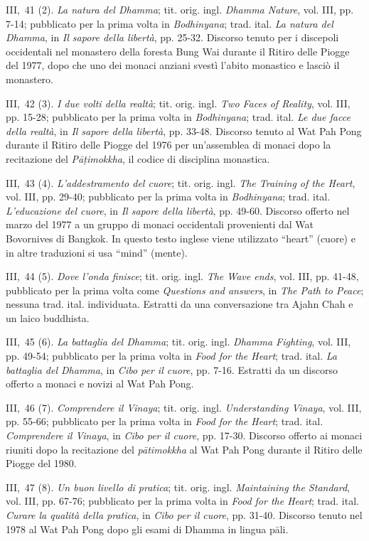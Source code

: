 III,~41 (2). \emph{La natura del Dhamma}; tit. orig. ingl. \emph{Dhamma
Nature}, vol. III, pp. 7-14; pubblicato per la prima volta in
\emph{Bodhinyana}; trad. ital. \emph{La natura del Dhamma}, in \emph{Il
sapore della libertà}, pp. 25-32. Discorso tenuto per i discepoli
occidentali nel monastero della foresta Bung Wai durante il Ritiro delle
Piogge del 1977, dopo che uno dei monaci anziani svestì l'abito
monastico e lasciò il monastero.

III,~42 (3). \emph{I due volti della realtà}; tit. orig. ingl. \emph{Two
Faces of Reality}, vol. III, pp. 15-28; pubblicato per la prima volta in
\emph{Bodhinyana}; trad. ital. \emph{Le due facce della realtà}, in
\emph{Il sapore della libertà}, pp. 33-48. Discorso tenuto al Wat Pah
Pong durante il Ritiro delle Piogge del 1976 per un'assemblea di monaci
dopo la recitazione del \emph{Pāṭimokkha}, il codice di disciplina
monastica.

III,~43 (4). \emph{L'addestramento del cuore}; tit. orig. ingl.
\emph{The Training of the Heart}, vol. III, pp. 29-40; pubblicato per la
prima volta in \emph{Bodhinyana}; trad. ital. \emph{L'educazione del
cuore}, in \emph{Il sapore della libertà}, pp. 49-60. Discorso offerto
nel marzo del 1977 a un gruppo di monaci occidentali provenienti dal Wat
Bovornives di Bangkok. In questo testo inglese viene utilizzato
``heart'' (cuore) e in altre traduzioni si usa ``mind'' (mente).

III,~44 (5). \emph{Dove l'onda finisce}; tit. orig. ingl. \emph{The Wave
ends}, vol. III, pp. 41-48, pubblicato per la prima volta come
\emph{Questions and answers}, in \emph{The Path to Peace}; nessuna trad.
ital. individuata. Estratti da una conversazione tra Ajahn Chah e un
laico buddhista.

III,~45 (6). \emph{La battaglia del Dhamma}; tit. orig. ingl.
\emph{Dhamma Fighting}, vol. III, pp. 49-54; pubblicato per la prima
volta in \emph{Food for the Heart}; trad. ital. \emph{La battaglia del
Dhamma}, in \emph{Cibo per il cuore}, pp. 7-16. Estratti da un discorso
offerto a monaci e novizi al Wat Pah Pong.

III,~46 (7). \emph{Comprendere il Vinaya}; tit. orig. ingl.
\emph{Understanding Vinaya}, vol. III, pp. 55-66; pubblicato per la
prima volta in \emph{Food for the Heart}; trad. ital. \emph{Comprendere
il Vinaya}, in \emph{Cibo per il cuore}, pp. 17-30. Discorso offerto ai
monaci riuniti dopo la recitazione del \emph{pātimokkha} al Wat Pah Pong
durante il Ritiro delle Piogge del 1980.

III,~47 (8). \emph{Un buon livello di pratica}; tit. orig. ingl.
\emph{Maintaining the Standard}, vol. III, pp. 67-76; pubblicato per la
prima volta in \emph{Food for the Heart}; trad. ital. \emph{Curare la
qualità della pratica}, in \emph{Cibo per il cuore}, pp. 31-40. Discorso
tenuto nel 1978 al Wat Pah Pong dopo gli esami di Dhamma in lingua pāli.

